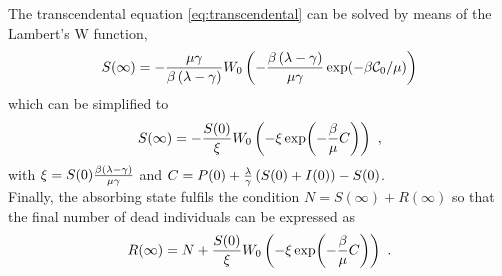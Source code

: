 The transcendental equation \cref{eq:transcendental} can be solved by means
of the Lambert's W function,
\begin{equation}
    S(\infty)=-\frac{\mu\gamma}{\beta\left(\lambda-\gamma\right)}
    W_0\left(-\frac{\beta\left(\lambda-\gamma\right)}{\mu\gamma}
        \exp(-\beta\mathcal{C}_0/\mu)\right)
\end{equation}
which can be simplified to
\begin{equation}\label{eq: S_inf}
    S(\infty)=-\frac{S(0)}{\xi}W_0\left(-\xi\exp(-\frac{\beta}{\mu}C)\right)
    \ ,
\end{equation}
with $\xi=S(0)\frac{\beta\left(\lambda-\gamma\right)}{\mu\gamma}$ and
$C=P(0)+\frac{\lambda}{\gamma}\left(S(0)+I(0)\right)-S(0)$.\\

Finally, the absorbing state fulfils the condition $N=S(\infty)+R(\infty)$
so that the final number of dead individuals can be expressed as
\begin{equation}
    R(\infty)=N+\frac{S(0)}{\xi}W_0\left(-\xi\exp(-\frac{\beta}{\mu}C)\right) \
    .
\end{equation}